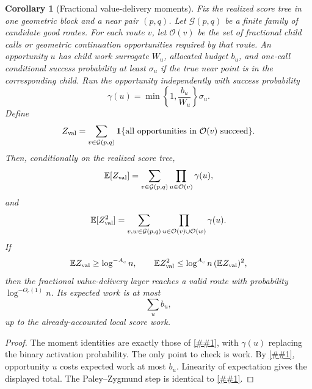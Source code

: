\documentclass[10pt]{article}
\newcommand{\cref}[1]{\ref{##1}}
\newtheorem{corollary}[theorem]{Corollary}
\theoremstyle{definition}
\newcommand{\E}{\mathbb{E}}
\begin{document}
\begin{corollary}[Fractional value-delivery moments]\label{cor:fractional-value-delivery}
   Fix the realized score tree in one geometric block and a near pair $(p,q)$.
   Let $\mathcal G(p,q)$ be a finite family of candidate good routes. For each
   route $v$, let $\mathcal O(v)$ be the set of fractional child calls or
   geometric continuation opportunities required by that route. An opportunity
   $u$ has child work surrogate $W_u$, allocated budget $b_u$, and one-call
   conditional success probability at least $\sigma_u$ if the true near point is
   in the corresponding child. Run the opportunity independently with success
   probability
   \[
      \gamma(u)
      =
      \min\left\{1,\frac{b_u}{W_u}\right\}\sigma_u .
   \]
   Define
   \[
      Z_{\rm val}
      =
      \sum_{v\in\mathcal G(p,q)}
      \mathbf 1\{\text{all opportunities in }\mathcal O(v)\text{ succeed}\}.
   \]
   Then, conditionally on the realized score tree,
   \[
      \E[Z_{\rm val}]
      =
      \sum_{v\in\mathcal G(p,q)}
      \prod_{u\in\mathcal O(v)}\gamma(u),
   \]
   and
   \[
      \E[Z_{\rm val}^2]
      =
      \sum_{v,w\in\mathcal G(p,q)}
      \prod_{u\in\mathcal O(v)\cup\mathcal O(w)}\gamma(u).
   \]
   If
   \[
      \E Z_{\rm val}\ge\log^{-A_c}n,
      \qquad
      \E Z_{\rm val}^2\le\log^{A_c}n\,(\E Z_{\rm val})^2,
   \]
   then the fractional value-delivery layer reaches a valid route with
   probability $\log^{-O_c(1)}n$. Its expected work is at most
   \[
      \sum_u b_u,
   \]
   up to the already-accounted local score work.
\end{corollary}

\begin{proof}
   The moment identities are exactly those of
   \cref{lem:activated-good-route-moments}, with $\gamma(u)$ replacing the
   binary activation probability. The only point to check is work. By
   \cref{lem:fractional-value-budget}, opportunity $u$ costs expected work at
   most $b_u$. Linearity of expectation gives the displayed total. The
   Paley--Zygmund step is identical to
   \cref{lem:activated-good-route-moments}.
\end{proof}
\end{document}
